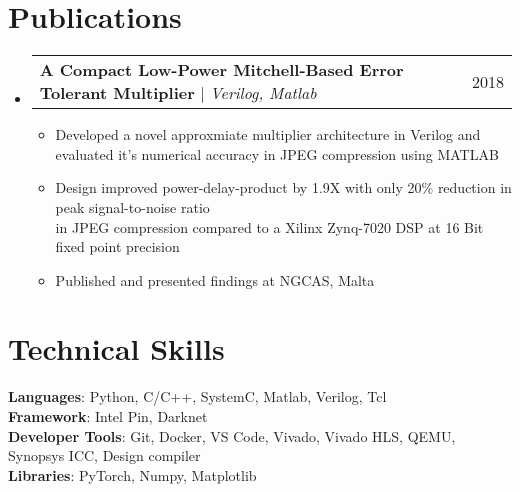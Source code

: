 \documentclass[letterpaper,11pt]{article}
\makeatletter
\newcommand{\resumeItem}[1]{
  \item\small{
    {#1 \vspace{-2pt}}
  }
}
\newcommand{\resumeProjectHeading}[2]{
    \item
    \begin{tabular*}{0.97\textwidth}{l@{\extracolsep{\fill}}r}
      \small#1 & #2 \\
    \end{tabular*}\vspace{-7pt}
}
\newcommand{\resumeSubHeadingListStart}{\begin{itemize}[leftmargin=0.15in, label={}]}
\newcommand{\resumeSubHeadingListEnd}{\end{itemize}}
\newcommand{\resumeItemListStart}{\begin{itemize}}
\newcommand{\resumeItemListEnd}{\end{itemize}\vspace{-5pt}}
\makeatother
\begin{document}
%
\section{Publications}
    \resumeSubHeadingListStart
      \resumeProjectHeading
          {\textbf{A Compact Low-Power Mitchell-Based Error Tolerant Multiplier} $|$ \emph{Verilog, Matlab} }{2018}
          \resumeItemListStart
            \resumeItem{Developed a novel approxmiate multiplier architecture in Verilog and evaluated it's numerical accuracy in JPEG compression using MATLAB }
            \resumeItem{Design improved power-delay-product by 1.9X with only 20\% reduction in peak signal-to-noise ratio \\ in JPEG compression compared to a Xilinx Zynq-7020 DSP at 16 Bit fixed point precision}
            \resumeItem{Published and presented findings at NGCAS, Malta}
          \resumeItemListEnd
    \resumeSubHeadingListEnd

%
\section{Technical Skills}
 \begin{itemize}[leftmargin=0.15in, label={}]
    \small{\item{
     \textbf{Languages}{: Python, C/C++, SystemC, Matlab, Verilog, Tcl} \\
     \textbf{Framework}{: Intel Pin, Darknet} \\
     \textbf{Developer Tools}{: Git, Docker, VS Code, Vivado, Vivado HLS, QEMU, Synopsys ICC, Design compiler} \\
     \textbf{Libraries}{: PyTorch, Numpy, Matplotlib}
    }}
 \end{itemize}

\end{document}
